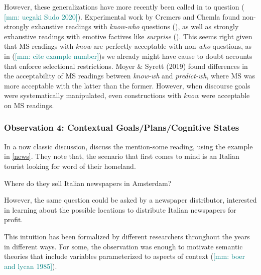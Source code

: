 \documentclass[12pt,letterpaper,table,svgnames,dvipsnames]{article}
\newcommand{\mm}[1]{\textcolor{teal}{[mm: #1]}}
\begin{document}
However, these generalizations have more recently been called in to question (\cite{cremchem2016,klineroth2011,theiler2014} \mm{uegaki Sudo 2020}). Experimental work by Cremers and Chemla found non-strongly exhaustive readings with \emph{know-who} questions (\cite{cremchem2014}), as well as strongly exhaustive readings with emotive factives like \emph{surprise} (\cite{cremchem2016}). This seems right given that MS readings with \emph{know} are perfectly acceptable with non-\emph{who}-questions, as in (\mm{cite example number})s we already might have cause to doubt accounts that enforce selectional restrictions. Moyer \& Syrett (2019) found differences in the acceptability of MS readings between \emph{know-wh} and \emph{predict-wh}, where MS was more acceptable with the latter than the former. However, when discourse goals were systematically manipulated, even constructions with \emph{know} were acceptable on MS readings.



\subsubsection{Observation 4: Contextual Goals/Plans/Cognitive States}

In a now classic discussion, \cite{groenstok1982,groenstok1984} discuss the mention-some reading, using the example in \ref{news}. They note that, the scenario that first comes to mind is an Italian tourist looking for word of their homeland.
\begin{exe}
\ex Where do they sell Italian newspapers in Amsterdam? \label{news}
\end{exe}
However, the same question could be asked by a newspaper distributor, interested in learning about the possible locations to distribute Italian newspapers for profit.

This intuition has been formalized by different researchers throughout the years in different ways. For some, the observation was enough to motivate semantic theories that include variables parameterized to aspects of context (\cite{boerlycan75,ginzburg1995a,ginzburg1995b,asherlascarides1998,lahiri2002,vanrooij2003,vanrooij2004}\mm{boer and lycan 1985}).
\end{document}
